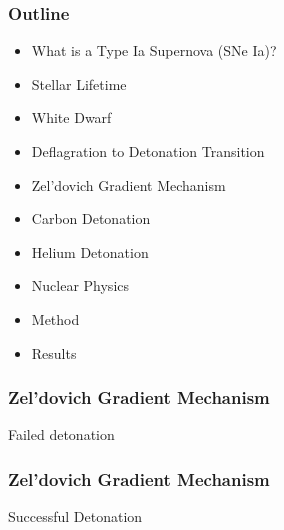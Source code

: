 \documentclass{beamer}
\begin{document}

\begin{frame}
	\frametitle{Outline}
	\begin{itemize}
		\item What is a Type Ia Supernova (SNe Ia)?
		\item Stellar Lifetime
		\item White Dwarf
		\item Deflagration to Detonation Transition
		\item Zel'dovich Gradient Mechanism
		\item Carbon Detonation
		\item Helium Detonation
		\item Nuclear Physics
		\item Method
		\item Results
	\end{itemize}
\end{frame}




\begin{frame}
\frametitle{Zel'dovich Gradient Mechanism}
        \vspace{20pt}

        \begin{center}
        \end{center}
        \begin{center}
                Failed detonation
        \end{center}
\end{frame}


\begin{frame}
        \frametitle{Zel'dovich Gradient Mechanism}

        \vspace{20pt}
        \begin{center}

        \caption{Successful Detonation}
        \end{center}

\end{frame}
\end{document}
